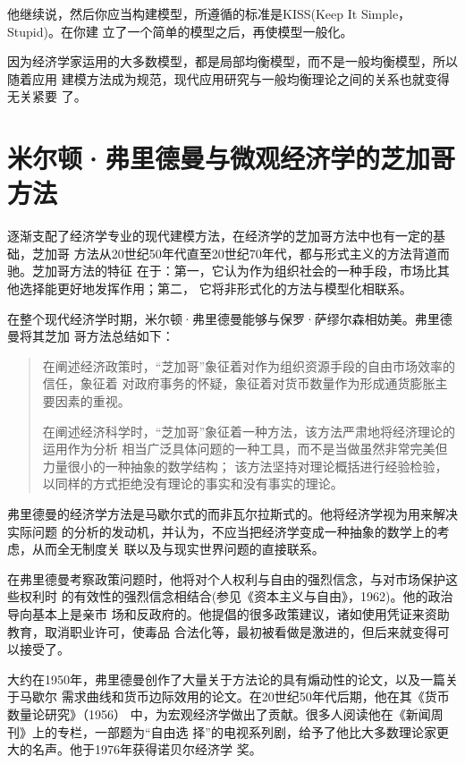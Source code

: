 他继续说，然后你应当构建模型，所遵循的标准是KISS(Keep It Simple，Stupid)。在你建
立了一个简单的模型之后，再使模型一般化。


因为经济学家运用的大多数模型，都是局部均衡模型，而不是一般均衡模型，所以随着应用
建模方法成为规范，现代应用研究与一般均衡理论之间的关系也就变得无关紧要
了。

\section{米尔顿·弗里德曼与微观经济学的芝加哥方法}

逐渐支配了经济学专业的现代建模方法，在经济学的芝加哥方法中也有一定的基础，芝加哥
方法从20世纪50年代直至20世纪70年代，都与形式主义的方法背道而驰。芝加哥方法的特征
在于：第一，它认为作为组织社会的一种手段，市场比其他选择能更好地发挥作用；第二，
它将非形式化的方法与模型化相联系。

在整个现代经济学时期，米尔顿·弗里德曼能够与保罗·萨缪尔森相妨美。弗里德曼将其芝加
哥方法总结如下：

\begin{quotation}
  在阐述经济政策时，“芝加哥”象征着对作为组织资源手段的自由市场效率的信任，象征着
  对政府事务的怀疑，象征着对货币数量作为形成通货膨胀主要因素的重视。

  在阐述经济科学时，“芝加哥”象征着一种方法，该方法严肃地将经济理论的运用作为分析
  相当广泛具体问题的一种工具，而不是当做虽然非常完美但力量很小的一种抽象的数学结构；
  该方法坚持对理论概括进行经验检验，以同样的方式拒绝没有理论的事实和没有事实的理论。
\end{quotation}

弗里德曼的经济学方法是马歇尔式的而非瓦尔拉斯式的。他将经济学视为用来解决实际问题
的分析的发动机，并认为，不应当把经济学变成一种抽象的数学上的考虑，从而全无制度关
联以及与现实世界问题的直接联系。

在弗里德曼考察政策问题时，他将对个人权利与自由的强烈信念，与对市场保护这些权利时
的有效性的强烈信念相结合(参见《资本主义与自由》，1962)。他的政治导向基本上是亲市
场和反政府的。他提倡的很多政策建议，诸如使用凭证来资助教育，取消职业许可，使毒品
合法化等，最初被看做是激进的，但后来就变得可以接受了。

大约在1950年，弗里德曼创作了大量关于方法论的具有煽动性的论文，以及一篇关于马歇尔
需求曲线和货币边际效用的论文。在20世纪50年代后期，他在其《货币数量论研究》（1956）
中，为宏观经济学做出了贡献。很多人阅读他在《新闻周刊》上的专栏，一部题为“自由选
择”的电视系列剧，给予了他比大多数理论家更大的名声。他于1976年获得诺贝尔经济学
奖。

